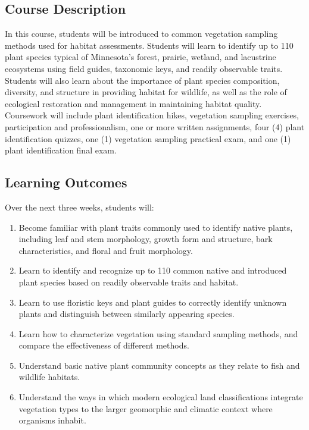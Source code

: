 \documentclass{tufte-handout}
\begin{document}
\begin{fullwidth}

\section{Course Description}

In this course, students will be introduced to common vegetation sampling methods used for habitat assessments. Students will learn to identify up to 110 plant species typical of Minnesota’s forest, prairie, wetland, and lacustrine ecosystems using field guides, taxonomic keys, and readily observable traits. Students will also learn about the importance of plant species composition, diversity, and structure in providing habitat for wildlife, as well as the role of ecological restoration and management in maintaining habitat quality. Coursework will include plant identification hikes, vegetation sampling exercises, participation and professionalism, one or more written assignments, four (4) plant identification quizzes, one (1) vegetation sampling practical exam, and one (1) plant identification final exam.

\subsection{Learning Outcomes}

Over the next three weeks, students will:

\begin{enumerate}
	\item Become familiar with plant traits commonly used to identify native plants, including leaf and stem morphology, growth form and structure, bark characteristics, and floral and fruit morphology.
	\item Learn to identify and recognize up to 110 common native and introduced plant species based on readily observable traits and habitat.
	\item Learn to use floristic keys and plant guides to correctly identify unknown plants and distinguish between similarly appearing species.
	\item Learn how to characterize vegetation using standard sampling methods, and compare the effectiveness of different methods.
	\item Understand basic native plant community concepts as they relate to fish and wildlife habitats.
	\item Understand the ways in which modern ecological land classifications integrate vegetation types to the larger geomorphic and climatic context where organisms inhabit.
\end{enumerate}


\end{fullwidth}
\end{document}
